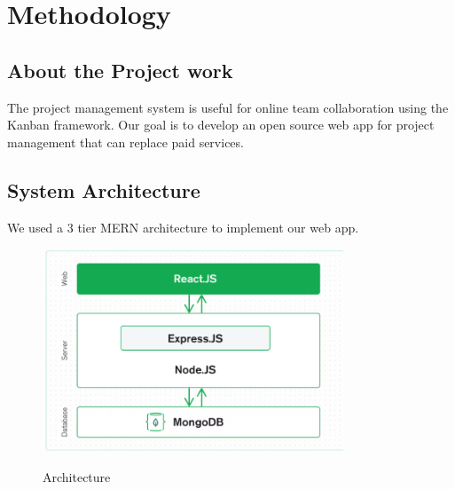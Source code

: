 \clearpage
\chapter{Methodology}

\section{About the Project work}
The project management system is useful for online team collaboration using the Kanban framework. Our goal is to develop an open source web app for project management that can replace paid services. 


 \section{System Architecture}
We used a 3 tier MERN architecture to implement our web app. 
\begin{figure}
    \centering
    \includegraphics[width = 0.8\textwidth]{mernarchi.png}\\[0.1in]
    \caption{Architecture}
    \label{fig:my_label}
\end{figure}
